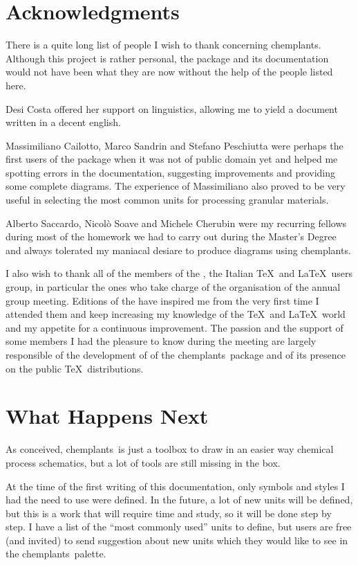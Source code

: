 \documentclass[12pt]{article}						%
\newcommand*{\chemplants}{chemplants}
\begin{document}
\section{Acknowledgments}

There is a quite long list of people I wish to thank concerning \chemplants.
Although this project is rather personal, the package and its documentation would
not have been what they are now without the help of the people listed here.

Desi Costa offered her support on linguistics, allowing me to yield a document
written in a decent english.

Massimiliano Cailotto, Marco Sandrin and Stefano Peschiutta were perhaps the
first users of the package when it was not of public domain yet and
helped me spotting errors in the documentation, suggesting improvements and
providing some complete diagrams. The experience of Massimiliano also proved
to be very useful in selecting the most common units for processing granular
materials.

Alberto Saccardo, Nicolò Soave and Michele Cherubin were my recurring fellows
during most of the homework we had to carry out during the Master's Degree and
always tolerated my maniacal desiare to produce diagrams using \chemplants.

I also wish to thank all of the members of the \GuIT, the Italian \TeX\ and
\LaTeX\ users group, in particular the ones who take charge of the organisation
of the annual group meeting. Editions of the \GuITmeeting[style=inline] have
inspired me from the very first time I attended them and keep increasing my
knowledge of the \TeX\ and \LaTeX\ world and my appetite for a continuous
improvement. The passion and the support of some members I had the pleasure to
know during the meeting are largely responsible of the development of of the
\chemplants\ package and of its presence on the public \TeX\ distributions.

\section{What Happens Next}

As conceived, \chemplants\ is just a toolbox to draw in an easier way chemical
process schematics, but a lot of tools are still missing in the box.

At the time of the first writing of this documentation, only symbols and styles
I had the need to use were defined. In the future, a lot of new units will
be defined, but this is a work that will require time and study, so it will be
done step by step. I have a list of the ``most commonly used'' units to
define, but users are free (and invited) to send suggestion about new units
which they would like to see in the \chemplants\ palette.
\end{document}
